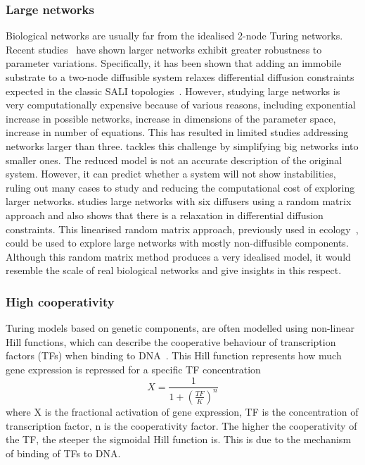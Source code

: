 \subsubsection{Large networks}
Biological networks are usually far from the idealised 2-node Turing networks. %
Recent studies~\parencite{Zheng2016, Scholes2019, Marcon} have shown larger networks exhibit greater robustness to parameter variations.
Specifically, it has been shown that adding an immobile substrate to a two-node diffusible system relaxes differential diffusion constraints expected in the classic SALI topologies~\parencite{korvasova2015}.
However, studying large networks is very computationally expensive because of various reasons, including exponential increase in possible networks, increase in dimensions of the parameter space, increase in number of equations.
This has resulted in limited studies addressing networks larger than three.
\cite{Smith2018a} tackles this challenge by simplifying big networks into smaller ones.
The reduced model is not an accurate description of the original system.
However, it can predict whether a system will not show instabilities, ruling out many cases to study and reducing the computational cost of exploring larger networks.
\cite{Haas2021} studies large networks with six diffusers using a random matrix approach and also shows that there is a relaxation in differential diffusion constraints.
This linearised random matrix approach, previously used in ecology~\parencite{May1972}, could be used to explore large networks with mostly non-diffusible components.
Although this random matrix method produces a very idealised model, it would resemble the scale of real biological networks and give insights in this respect.


\subsubsection{High cooperativity}
Turing models based on genetic components, are often modelled using non-linear Hill functions, which can describe the cooperative behaviour of transcription factors (TFs) when binding to DNA~\parencite{Morgunova2017}.
This Hill function represents how much gene expression is repressed for a specific TF concentration
\begin{equation}
    X = \frac{1}{1+(\frac{TF}{K})^n}
\end{equation}
where X is the fractional activation of gene expression, TF is the concentration of transcription factor, n is the cooperativity factor.
The higher the cooperativity of the TF, the steeper the sigmoidal Hill function is.
This is due to the mechanism of binding of TFs to DNA.

